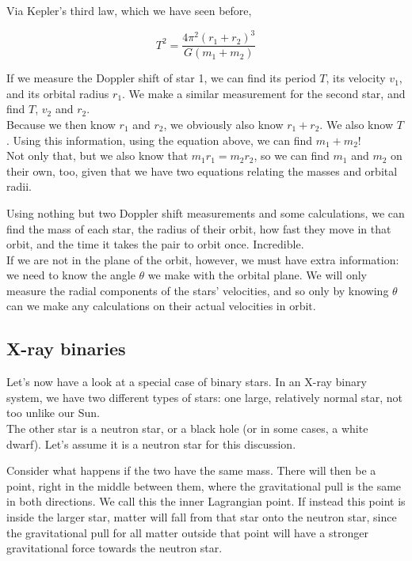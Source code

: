 Via Kepler's third law, which we have seen before,

\begin{equation}
T^2 = \frac{4 \pi^2 (r_1 + r_2)^3}{G (m_1 + m_2)}
\end{equation}

If we measure the Doppler shift of star 1, we can find its period $T$, its velocity $v_1$, and its orbital radius $r_1$. We make a similar measurement for the second star, and find $T$, $v_2$ and $r_2$.\\
Because we then know $r_1$ and $r_2$, we obviously also know $r_1 + r_2$. We also know $T$. Using this information, using the equation above, we can find $m_1 + m_2$!\\
Not only that, but we also know that $m_1 r_1 = m_2 r_2$, so we can find $m_1$ and $m_2$ on their own, too, given that we have two equations relating the masses and orbital radii.

Using nothing but two Doppler shift measurements and some calculations, we can find the mass of each star, the radius of their orbit, how fast they move in that orbit, and the time it takes the pair to orbit once. Incredible.\\
If we are not in the plane of the orbit, however, we must have extra information: we need to know the angle $\theta$ we make with the orbital plane. We will only measure the radial components of the stars' velocities, and so only by knowing $\theta$ can we make any calculations on their actual velocities in orbit.

\subsection{X-ray binaries}

Let's now have a look at a special case of binary stars. In an X-ray binary system, we have two different types of stars: one large, relatively normal star, not too unlike our Sun.\\
The other star is a neutron star, or a black hole (or in some cases, a white dwarf). Let's assume it is a neutron star for this discussion.

Consider what happens if the two have the same mass. There will then be a point, right in the middle between them, where the gravitational pull is the same in both directions. We call this the inner Lagrangian point. If instead this point is inside the larger star, matter will fall from that star onto the neutron star, since the gravitational pull for all matter outside that point will have a stronger gravitational force towards the neutron star.

